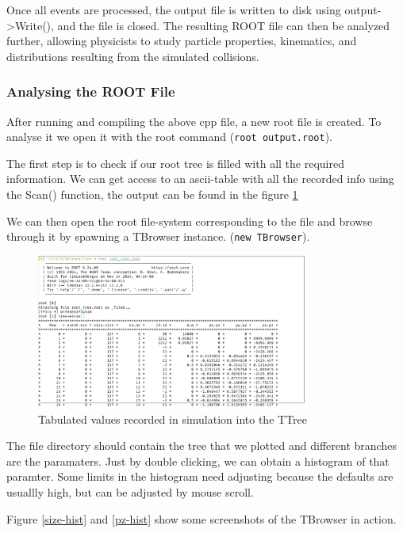 \documentclass[letterpaper,12pt]{article}
\begin{document}
\begin{spacing}{1.125}
Once all events are processed, the output file is written to disk using output->Write(),
and the file is closed. The resulting ROOT file can then be analyzed further, allowing
physicists to study particle properties, kinematics, and distributions resulting from the
simulated collisions.

\subsubsection{Analysing the ROOT File}

After running and compiling the above cpp file, a new root file is created. To
analyse it we open it with the root command (\texttt{root output.root}).

The first step is to check if our root tree is filled with all the required
information. We can get access to an ascii-table with all the recorded info
using the Scan() function, the output can be found in the figure \ref{table}

We can then open the root file-system corresponding to the file and browse
through it by spawning a TBrowser instance. (\texttt{new TBrowser}).
\clearpage
\begin{figure}[!htb]
  \includegraphics[width=0.8\textwidth]{table.png}
  \caption{Tabulated values recorded in simulation into the TTree}
  \label{table}
\end{figure}


The file directory should contain the tree that we plotted and different
branches are the paramaters. Just by double clicking, we can obtain a histogram
of that paramter. Some limits in the histogram need adjusting because the
defaults are usuallly high, but can be adjusted by mouse scroll.

Figure \ref{size-hist} and \ref{pz-hist} show some screenshots of the TBrowser
in action.


\end{spacing}
\end{document}
